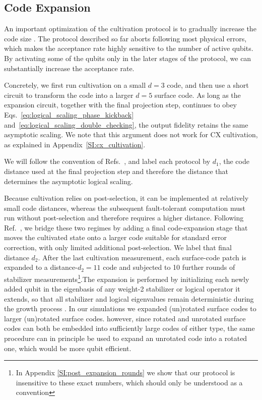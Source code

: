 \documentclass[twocolumn,notitlepage,nofootinbib,floatfix,superscriptaddress]{revtex4-1}
\begin{document}
\subsection{Code Expansion}

An important optimization of the cultivation protocol is to gradually increase the code size \cite{goto2016minimizing, gidney2024magic}. The protocol described so far aborts following most physical errors, which makes the acceptance rate highly sensitive to the number of active qubits. By activating some of the qubits only in the later stages of the protocol, we can substantially increase the acceptance rate.

Concretely, we first run cultivation on a small $d=3$ code, and then use a short circuit to transform the code into a larger $d=5$ surface code. As long as the expansion circuit, together with the final projection step, continues to obey Eqs.~\eqref{eq:logical_scaling_phase_kickback} and~\eqref{eq:logical_scaling_double_checking}, the output fidelity retains the same asymptotic scaling. We note that this argument does not work for CX cultivation, as explained in Appendix~\ref{SI:cx_cultivation}. 

We will follow the convention of Refs.~\cite{gidney2024magic, chen2025efficient}, and label each protocol by $d_1$, the code distance used at the final projection step and therefore the distance that determines the asymptotic logical scaling. 

Because cultivation relies on post-selection, it can be implemented at relatively small code distances, whereas the subsequent fault-tolerant computation must run without post-selection and therefore requires a higher distance. Following Ref.~\cite{gidney2024magic}, we bridge these two regimes by adding a final code-expansion stage that moves the cultivated state onto a larger code suitable for standard error correction, with only limited additional post-selection. We label that final distance $d_2$. After the last cultivation measurement, each surface-code patch is expanded \cite{goto2014step,gidney2023cleaner,gidney2024magic} to a distance-$d_2 = 11$ code and subjected to 10 further rounds of stabilizer measurements\footnote{In  Appendix \ref{SI:post_expansion_rounds} we show that our protocol is insensitive to these exact numbers, which should only be understood as a convention}.The expansion is performed by initializing each newly added qubit in the eigenbasis of any weight-2 stabilizer or logical operator it extends, so that all stabilizer and logical eigenvalues remain deterministic during the growth process \cite{gidney2023cleaner}. In our simulations we expanded (un)rotated surface codes to larger (un)rotated surface codes. however, since rotated and unrotated surface codes can both be embedded into sufficiently large codes of either type, the same procedure can in principle be used to expand an unrotated code into a rotated one, which would be more qubit efficient. 
\end{document}
